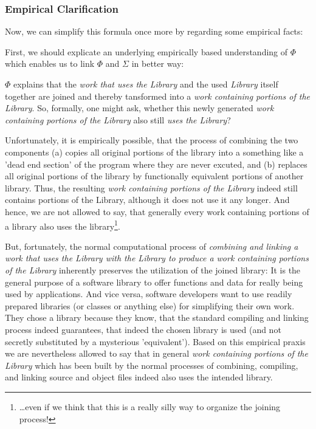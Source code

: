 \subsubsection{Empirical Clarification}

Now, we can simplify this formula once more by regarding some empirical facts:

First, we should explicate an underlying empirically based understanding of
$\Phi$ which enables us to link $\Phi$ and $\Sigma$ in better way:

$\Phi$ explains that the \emph{work that uses the Library} and the used
\emph{Library} itself together are joined and thereby tansformed into a
\emph{work containing portions of the Library}. So, formally, one might ask,
whether this newly generated \emph{work containing portions of the Library} also
still \emph{uses the Library}?

Unfortunately, it is empirically possible, that the process of combining the two
components (a) copies all original portions of the library into a something like
a 'dead end section' of the program where they are never excuted, and (b)
replaces all original portions of the library by functionally equivalent
portions of another library. Thus, the resulting \emph{work containing portions
of the Library} indeed still contains portions of the Library, although it does
not use it any longer. And hence, we are not allowed to say, that generally
every work containing portions of a library also uses the
library\footnote{\ldots even if we think that this is a really silly way to
organize the joining process!}.

But, fortunately, the normal computational process of \emph{combining and
linking a work that uses the Library with the Library to produce a work
containing portions of the Library} inherently preserves the utilization of the
joined library: It is the general purpose of a software library to offer
functions and data for really being used by applications. And vice versa,
software developers want to use readily prepared libraries (or classes or
anything else) for simplifying their own work. They chose a library because they
know, that the standard compiling and linking process indeed guarantees, that
indeed the chosen library is used (and not secretly substituted by a mysterious
'equivalent'). Based on this empirical praxis we are nevertheless allowed to say
that in general \emph{work containing portions of the Library} which has been
built by the normal processes of combining, compiling, and linking source and
object files indeed also uses the intended library.

